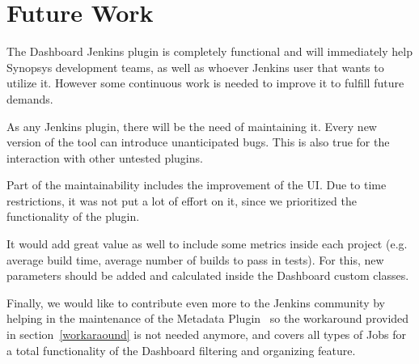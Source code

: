 \section{Future Work}

The Dashboard Jenkins plugin is completely functional and will immediately help Synopsys development teams, as well as whoever Jenkins user that wants to utilize it. However some continuous work is needed to improve it to fulfill future demands.

As any Jenkins plugin, there will be the need of maintaining it. Every new version of the tool can introduce unanticipated bugs. This is also true for the interaction with other untested plugins.

Part of the maintainability includes the improvement of the UI. Due to time restrictions, it was not put a lot of effort on it, since we prioritized the functionality of the plugin.

It would add great value as well to include some metrics inside each project (e.g. average build time, average number of builds to pass in tests). For this, new parameters should be added and calculated inside the Dashboard custom classes. 

Finally, we would like to contribute even more to the Jenkins community by helping in the maintenance of the Metadata Plugin~\cite{jkns:metadata} so the workaround provided in section~\ref{workaraound} is not needed anymore, and covers all types of Jobs for a total functionality of the Dashboard filtering and organizing feature.  

\vspace*{12mm}